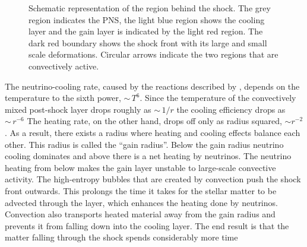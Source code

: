 \begin{figure}
\begin{center}
\end{center}
\caption{Schematic representation of the region behind the shock. The grey region indicates the PNS, the light blue
region shows the cooling layer and the gain layer is indicated by the light red region. The dark red boundary shows the shock
front with its large and small scale deformations. Circular arrows indicate the two regions that are convectively active.}
\label{figSN:post}
\end{figure}
The neutrino-cooling rate, caused by the reactions described by , depends on the temperature to the sixth power, $\sim \, T^6$. 
Since the temperature of the convectively mixed 
post-shock layer drops roughly as $\sim \, 1/r$ \citep{janka_12} the cooling efficiency drops as $\sim \, r^{-6}$  
The heating rate, on the other hand, drops off only as radius squared, $\sim r^{-2}$.     
As a result, there exists a radius where heating and cooling effects balance each other.
This radius is called the ``gain radius''. Below the gain radius neutrino cooling dominates
and above there is a net heating by neutrinos. The neutrino heating from below makes the gain layer unstable to
large-scale convective activity. The high-entropy bubbles that are created by convection
push the shock front outwards. This prolongs the time it takes for the stellar matter to be advected through the layer, which enhances the heating done by neutrinos. 
Convection also transports heated material away from the gain radius and prevents it from falling down into
the cooling layer. The end result is that the matter falling through the shock spends considerably more time
